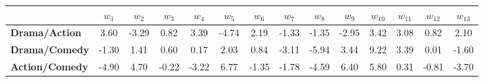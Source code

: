 \begin{tabular}{|l|c|c|c|c|c|c|c|c|c|c|c|c|c|}
\hline
&\textbf{$w_{1}$}&\textbf{$w_{2}$}&\textbf{$w_{3}$}&\textbf{$w_{4}$}&\textbf{$w_{5}$}&\textbf{$w_{6}$}&\textbf{$w_{7}$}&\textbf{$w_{8}$}&\textbf{$w_{9}$}&\textbf{$w_{10}$}&\textbf{$w_{11}$}&\textbf{$w_{12}$}&\textbf{$w_{13}$}\\\hline
\textbf{Drama/Action}&3.60&-3.29&0.82&3.39&-4.74&2.19&-1.33&-1.35&-2.95&3.42&3.08&0.82&2.10\\\hline
\textbf{Drama/Comedy}&-1.30&1.41&0.60&0.17&2.03&0.84&-3.11&-5.94&3.44&9.22&3.39&0.01&-1.60\\\hline
\textbf{Action/Comedy}&-4.90&4.70&-0.22&-3.22&6.77&-1.35&-1.78&-4.59&6.40&5.80&0.31&-0.81&-3.70\\\hline
\end{tabular}
